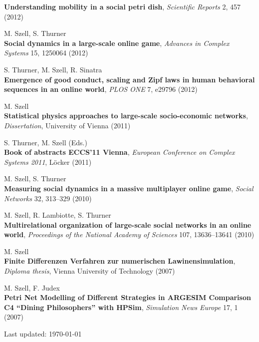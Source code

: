 \documentclass[10pt,a4paper]{article}
\begin{document}
\begin{etaremune}
    \textbf{Understanding mobility in a social petri dish}, \textit{Scientific Reports} 2, 457 (2012)
\item M. Szell, S. Thurner\\
    \textbf{Social dynamics in a large-scale online game}, \textit{Advances in Complex Systems} 15, 1250064 (2012)
\item S. Thurner, M. Szell, R. Sinatra\\
    \textbf{Emergence of good conduct, scaling and Zipf laws in human behavioral sequences in an online world}, \textit{PLOS ONE} 7, e29796 (2012)
\item M. Szell\\
    \textbf{Statistical physics approaches to large-scale socio-economic networks}, \textit{Dissertation}, University of Vienna (2011)
\item S. Thurner, M. Szell (Eds.)\\
    \textbf{Book of abstracts ECCS{'}11 Vienna}, \textit{European Conference on Complex Systems 2011}, L\"ocker (2011)
\item M. Szell, S. Thurner\\
    \textbf{Measuring social dynamics in a massive multiplayer online game}, \textit{Social Networks} 32, 313--329 (2010)
\item M. Szell, R. Lambiotte, S. Thurner\\
    \textbf{Multirelational organization of large-scale social networks in an online world}, \textit{Proceedings of the National Academy of Sciences} 107, 13636--13641 (2010)
\item M. Szell\\
    \textbf{Finite Differenzen Verfahren zur numerischen Lawinensimulation}, \textit{Diploma thesis}, Vienna University of Technology (2007)
\item M. Szell, F. Judex\\
    \textbf{Petri Net Modelling of Different Strategies in ARGESIM Comparison C4 ``Dining Philosophers'' with HPSim}, \textit{Simulation News Europe} 17, 1 (2007)
\end{etaremune}



\bigskip

\begin{center}
  \begin{small}
    Last updated: \today
  \end{small}
\end{center}
\end{document}
